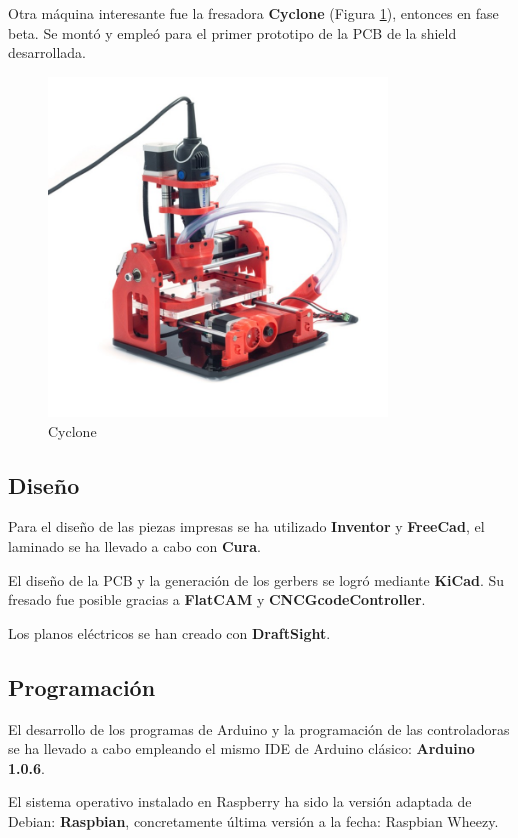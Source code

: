 Otra máquina interesante fue la fresadora \textbf{Cyclone} (Figura \ref{fig:cyclone}), entonces en fase beta. Se montó y empleó para el primer prototipo de la PCB de la shield desarrollada.

\begin{figure}[h]
\centering
\includegraphics[width=90mm]{Figures/cyclone.jpg}
\caption[Cyclone]{Cyclone}
\label{fig:cyclone}
\end{figure}

\subsection{Diseño}

Para el diseño de las piezas impresas se ha utilizado \textbf{Inventor} y \textbf{FreeCad}, el laminado se ha llevado a cabo con \textbf{Cura}.

El diseño de la PCB y la generación de los gerbers se logró mediante \textbf{KiCad}. Su fresado fue posible gracias a \textbf{FlatCAM} y \textbf{CNCGcodeController}.

Los planos eléctricos se han creado con \textbf{DraftSight}.

\subsection{Programación}

El desarrollo de los programas de Arduino y la programación de las controladoras se ha llevado a cabo empleando el mismo IDE de Arduino clásico: \textbf{Arduino 1.0.6}.

El sistema operativo instalado en Raspberry ha sido la versión adaptada de Debian: \textbf{Raspbian}, concretamente última versión a la fecha: Raspbian Wheezy.

